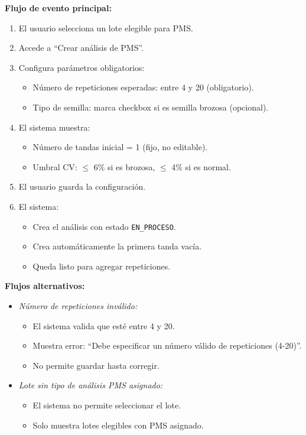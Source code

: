 \vspace{0.5em}
\noindent\textbf{Flujo de evento principal:}
\begin{enumerate}[nosep]
    \item El usuario selecciona un lote elegible para PMS.
    \item Accede a ``Crear análisis de PMS''.
    \item Configura parámetros obligatorios:
    \begin{itemize}[nosep]
        \item Número de repeticiones esperadas: entre 4 y 20 (obligatorio).
        \item Tipo de semilla: marca checkbox si es semilla brozosa (opcional).
    \end{itemize}
    \item El sistema muestra:
    \begin{itemize}[nosep]
        \item Número de tandas inicial = 1 (fijo, no editable).
        \item Umbral CV: $\leq$ 6\% si es brozosa, $\leq$ 4\% si es normal.
    \end{itemize}
    \item El usuario guarda la configuración.
    \item El sistema:
    \begin{itemize}[nosep]
        \item Crea el análisis con estado \texttt{EN\_PROCESO}.
        \item Crea automáticamente la primera tanda vacía.
        \item Queda listo para agregar repeticiones.
    \end{itemize}
\end{enumerate}

\vspace{0.5em}
\noindent\textbf{Flujos alternativos:}
\begin{itemize}[nosep]
    \item \textit{Número de repeticiones inválido:}
    \begin{itemize}[nosep]
        \item El sistema valida que esté entre 4 y 20.
        \item Muestra error: ``Debe especificar un número válido de repeticiones (4-20)''.
        \item No permite guardar hasta corregir.
    \end{itemize}
    \item \textit{Lote sin tipo de análisis PMS asignado:}
    \begin{itemize}[nosep]
        \item El sistema no permite seleccionar el lote.
        \item Solo muestra lotes elegibles con PMS asignado.
    \end{itemize}
\end{itemize}

